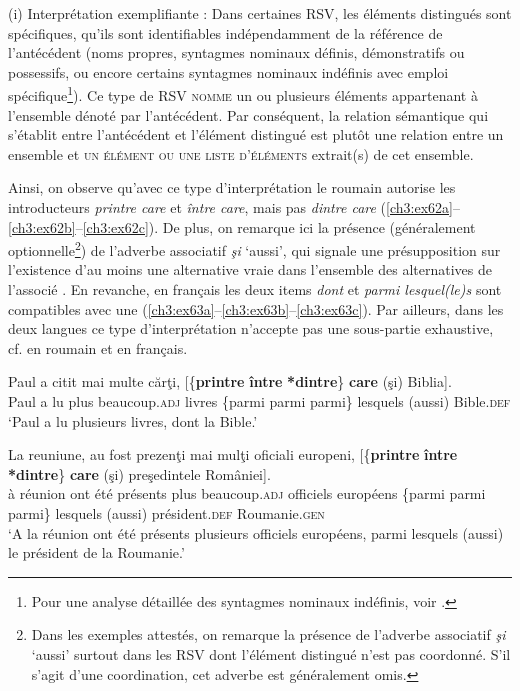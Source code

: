 (i) Interprétation exemplifiante : Dans certaines RSV, les éléments distingués sont spécifiques, {\cad} qu’ils sont identifiables indépendamment de la référence de l’antécédent (noms propres, syntagmes nominaux définis, démonstratifs ou possessifs, ou encore certains syntagmes nominaux indéfinis avec emploi spécifique\footnote{Pour une analyse détaillée des syntagmes nominaux indéfinis, voir \citet{Dobrovie-SorinEtAl2004}.}). Ce type de RSV \textsc{nomme} un ou plusieurs éléments appartenant à l’ensemble dénoté par l’antécédent. Par conséquent, la relation sémantique qui s’établit entre l’antécédent et l’élément distingué est plutôt une relation entre un ensemble et \textsc{un élément ou une liste d’éléments} extrait(s) de cet ensemble. 

Ainsi, on observe qu’avec ce type d’interprétation le roumain autorise les introducteurs \textit{printre care} et \textit{între care}, mais pas \textit{dintre care} (\ref{ch3:ex62a}--\ref{ch3:ex62b}--\ref{ch3:ex62c}). De plus, on remarque ici la présence (généralement optionnelle\footnote{ Dans les exemples attestés, on remarque la présence de l’adverbe associatif \textit{şi} ‘aussi’ surtout dans les RSV dont l’élément distingué n’est pas coordonné. S’il s’agit d’une coordination, cet adverbe est généralement omis.}) de l’adverbe associatif \textit{şi} ‘aussi’, qui signale une présupposition sur l’existence d’au moins une alternative vraie dans l’ensemble des alternatives de l’associé \citep{RoussarieToAppear}. En revanche, en français les deux items \textit{dont} et \textit{parmi lesquel(le)s} sont compatibles avec une  (\ref{ch3:ex63a}--\ref{ch3:ex63b}--\ref{ch3:ex63c}). Par ailleurs, dans les deux langues ce type d’interprétation n’accepte pas une sous-partie exhaustive, cf.  en roumain et  en français.

\ea \label{ch3:ex62} 
\ea
\gll Paul  a  citit  mai  multe  cărţi,  [\{\textbf{printre}  {\textbar}  \textbf{între}  {\textbar}  \textbf{*dintre}\}  \textbf{care} (şi)  Biblia]. \label{ch3:ex62a}\\
Paul  a  lu  plus  beaucoup.\textsc{adj}  livres  \{parmi  {\textbar}  parmi  {\textbar}  parmi\} lesquels (aussi)  Bible.\textsc{def} \\
\glt ‘Paul a lu plusieurs livres, dont la Bible.’

\ex 
\gll La  reuniune,  au  fost  prezenţi  mai  mulţi  oficiali  europeni,  [\{\textbf{printre}  {\textbar}  \textbf{între} {\textbar}  \textbf{*dintre}\} \textbf{care}  (şi)  preşedintele  României]. \label{ch3:ex62b}\\
à  réunion  ont  été  présents  plus  beaucoup.\textsc{adj}  officiels  européens  \{parmi {\textbar}  parmi  {\textbar}  parmi\} lesquels  (aussi)  président.\textsc{def}  Roumanie.\textsc{gen} \\
\glt ‘A la réunion ont été présents plusieurs officiels européens, parmi lesquels (aussi) le président de la Roumanie.’


